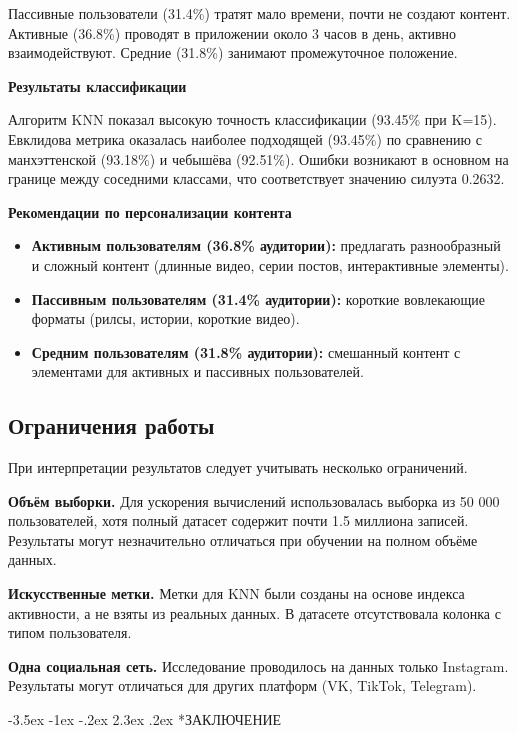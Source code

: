 \documentclass[14pt, a4paper]{extarticle}
\makeatletter
\renewcommand\section{\@startsection {section}{1}{\z@}%
                                   {-3.5ex \@plus -1ex \@minus -.2ex}%
                                   {2.3ex \@plus.2ex}%
                                   {\centering\normalfont\Large\bfseries}}
\makeatother
\begin{document}
Пассивные пользователи (31.4\%) тратят мало времени, почти не создают контент. Активные (36.8\%) проводят в приложении около 3 часов в день, активно взаимодействуют. Средние (31.8\%) занимают промежуточное положение.

\textbf{Результаты классификации}

Алгоритм KNN показал высокую точность классификации (93.45\% при K=15). Евклидова метрика оказалась наиболее подходящей (93.45\%) по сравнению с манхэттенской (93.18\%) и чебышёва (92.51\%). Ошибки возникают в основном на границе между соседними классами, что соответствует значению силуэта 0.2632.

\textbf{Рекомендации по персонализации контента}

\begin{itemize}
    \item \textbf{Активным пользователям (36.8\% аудитории):} предлагать разнообразный и сложный контент (длинные видео, серии постов, интерактивные элементы).
    \item \textbf{Пассивным пользователям (31.4\% аудитории):} короткие вовлекающие форматы (рилсы, истории, короткие видео).
    \item \textbf{Средним пользователям (31.8\% аудитории):} смешанный контент с элементами для активных и пассивных пользователей.
\end{itemize}

\subsection{Ограничения работы}

При интерпретации результатов следует учитывать несколько ограничений.

\textbf{Объём выборки.} Для ускорения вычислений использовалась выборка из 50 000 пользователей, хотя полный датасет содержит почти 1.5 миллиона записей. Результаты могут незначительно отличаться при обучении на полном объёме данных.

\textbf{Искусственные метки.} Метки для KNN были созданы на основе индекса активности, а не взяты из реальных данных. В датасете отсутствовала колонка с типом пользователя.

\textbf{Одна социальная сеть.} Исследование проводилось на данных только Instagram. Результаты могут отличаться для других платформ (VK, TikTok, Telegram).

\newpage
\section*{ЗАКЛЮЧЕНИЕ}
\end{document}
